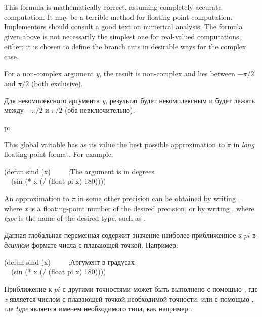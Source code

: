 \begin{defun}[Function]
\beforenoterule
\begin{implementation}
This formula is mathematically correct, assuming
completely accurate computation.  It may be a terrible method for
floating-point computation.  Implementors should consult a good text on
numerical analysis.  The formula given above is not necessarily
the simplest one for real-valued computations, either; it is chosen
to define the branch cuts in desirable ways for the complex case.
\end{implementation}
\afternoterule

For a non-complex argument \emph{y}, the result is non-complex and lies between
$-\pi/2$ and $\pi/2$ (both exclusive).

Для некомплексного аргумента \emph{y}, результат будет некомплексным и будет
лежать между $-\pi/2$ и $\pi/2$ (оба невключительно).
\end{defun}

\begin{defun}[Constant]
pi

This global variable has as its value the best possible approximation to
$\pi$ in \emph{long} floating-point format.
For example:
\begin{lisp}
(defun sind (x)~~~~~;\textrm{The argument is in degrees} \\
~~(sin (* x (/ (float pi x) 180))))
\end{lisp}
An approximation to $\pi$ in some other precision can
be obtained by writing , where \emph{x} is a
floating-point number of the desired precision,
or by writing , where \emph{type} is the
name of the desired type, such as .

Данная глобальная переменная содержит значение наиболее приближенное к $pi$ в
\emph{длинном} формате числа с плавающей точкой.
Например:
\begin{lisp}
(defun sind (x)~~~~~;\textrm{Аргумент в градусах} \\
~~(sin (* x (/ (float pi x) 180))))
\end{lisp}
Приближение к $pi$ с другими точностями может быть выполнено с помощью
, где \emph{x} является числом с плавающей точкой
необходимой точности, или с помощью  , где
\emph{type} является именем необходимого типа, как например .
\end{defun}

\relax

